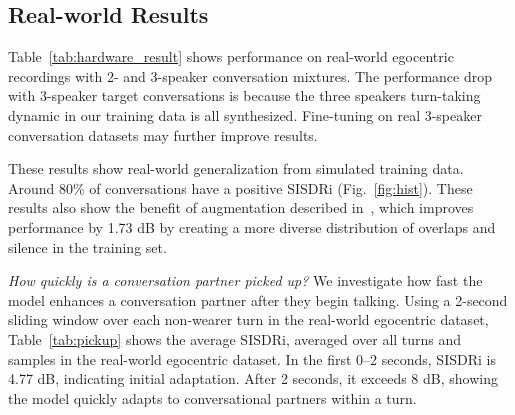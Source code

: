 {\subsection{Real-world Results}


Table~\ref{tab:hardware_result} shows performance on real-world egocentric recordings with 2- and 3-speaker conversation mixtures.  The performance drop with 3-speaker target conversations is because the three speakers turn-taking dynamic in our training data is all synthesized. Fine-tuning on real 3-speaker conversation datasets may further improve results. 

These results show  real-world generalization from simulated training data. Around 80\% of conversations have a positive SISDRi (Fig.~\ref{fig:hist}).  These results also show the benefit of augmentation described  in~, which improves performance by 1.73 dB by creating a more diverse distribution of overlaps and silence in the training set. 








{\it How quickly is a conversation partner picked up?} We investigate how fast the model enhances a conversation partner after they begin talking. Using a 2-second sliding window over each non-wearer turn in the real-world egocentric dataset, Table~\ref{tab:pickup} shows the average SISDRi,  averaged over all turns and samples in the real-world egocentric dataset. In the first 0–2 seconds, SISDRi is 4.77 dB, indicating initial adaptation. After 2 seconds, it exceeds 8 dB, showing the model quickly adapts to  conversational partners within a turn.












}
